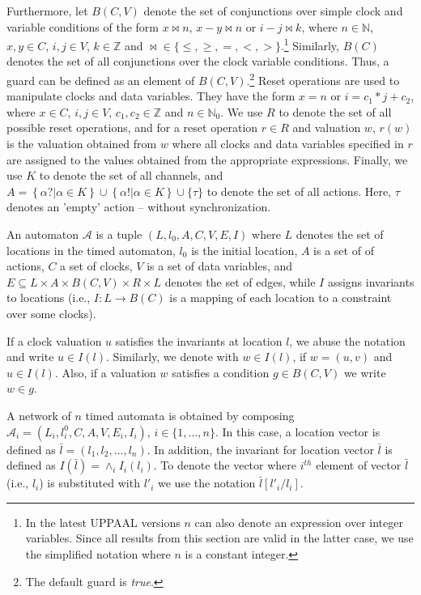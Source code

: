 Furthermore, let $B(C,V)$ denote the set of conjunctions over simple clock and variable conditions of the form $x\bowtie n$, $x-y\bowtie n$ or $i-j\bowtie k$, where $n\in \mathbb{N}$, $x,y\in C$, $i,j\in V$, $k\in\mathbb{Z}$ and $\bowtie\in\{\leq,\geq,=,<,>\}$.\footnote{In the latest UPPAAL versions $n$ can also denote an expression over integer variables. Since all results from this section are valid in the latter case, we use the simplified notation where $n$ is a constant integer.} Similarly, $B(C)$ denotes the set of all conjunctions over the clock variable conditions. Thus, a guard can be defined as an element of $B(C,V)$.\footnote{The default guard is \textit{true}.} 
Reset operations are used to manipulate clocks and data variables. They have the form $x=n$ or $i=c_1*j+c_2$, where $x\in C$, $i,j\in V$, $c_1,c_2\in \mathbb{Z}$ and $n\in\mathbb{N}_0$. We use $R$ to denote the set of all possible reset operations, and for a reset operation $r\in R$ and valuation $w$, $r(w)$ is the valuation obtained from $w$ where all clocks and data variables specified in $r$ are assigned to the values obtained from the appropriate expressions. 
Finally, we use $K$ to denote the set of all channels, and $A=\left\{\alpha ? | \alpha\in K\right\}\cup\left\{\alpha !|\alpha\in K\right\}\cup \{\tau\}$ to denote the set of all actions. Here, $\tau$ denotes an 'empty' action -- without synchronization.


\begin{definition}%
An automaton $\mathcal{A}$ is a tuple $(L,l_0,A,C,V,E,I)$ where $L$ denotes the set of locations in the timed automaton, $l_0$ is the initial location, $A$ is a set of of actions, $C$  a set of clocks, $V$ is a set of data variables, and $E\subseteq L\times A\times B(C,V)\times R \times L$ denotes the set of edges, while $I$ assigns invariants to locations (i.e., $I: L\rightarrow B(C)$ is a mapping of each location to a constraint over some clocks).
\end{definition}

If a clock valuation $u$ satisfies the invariants at location $l$, we abuse the notation and write $u\in I(l)$. Similarly, we denote with $w\in I(l)$, if $w=(u,v)$ and $u\in I(l)$. Also, if a valuation $w$ satisfies a condition $g\in B(C,V)$ we write $w\in g$. 

A network of $n$ timed automata is obtained by composing  $\mathcal{A}_i=(L_i,l_i^0,C,A,V,E_i,I_i)$, $i\in\{1,...,n\}$. In this case, a location vector is defined as $\bar{l}=(l_1,l_2,...,l_n)$. In addition, the invariant for location vector $\bar{l}$ is defined as $I(\bar{l})=\wedge_i I_i(l_i)$. To denote the vector where $i^{th}$ element of vector $\bar{l}$ (i.e., $l_i$) is substituted with $l'_{i}$ we use the notation $\bar{l}[l'_i/l_i]$. 

